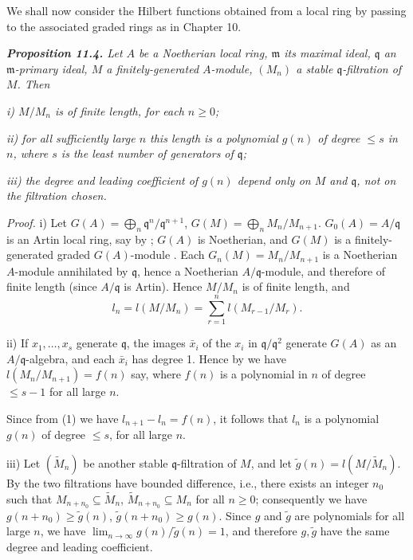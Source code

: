 We shall now consider the Hilbert functions obtained from a local ring by
passing to the associated graded rings as in Chapter 10.

\medskip
\noindent\textit{\textbf{Proposition 11.4.} Let $A$ be a Noetherian local ring, $\mathfrak m$ its maximal ideal,
$\mathfrak q$ an $\mathfrak m$-primary ideal, $M$ a finitely-generated $A$-module, $(M_n)$ a stable $\mathfrak q$-filtration of $M$.  Then}

\noindent\textit{i) $M/M_n$ is of finite length, for each $n\geq0$;}

\noindent\textit{ii) for all sufficiently large $n$ this length is a polynomial $g(n)$ of degree $\leq s$
in $n$, where $s$ is the least number of generators of $\mathfrak q$;}

\noindent\textit{iii) the degree and leading coefficient of $g(n)$ depend only on $M$ and $\mathfrak q$, not on
the filtration chosen.}

\noindent\emph{Proof.}  i) Let $G(A)=\bigoplus_n\mathfrak q^n/\mathfrak q^{n+1}$, $G(M)=\bigoplus_nM_n/M_{n+1}$.  $G_0(A)=A/\mathfrak q$ is an
Artin local ring, say by ; $G(A)$ is Noetherian, and $G(M)$ is a finitely-generated graded $G(A)$-module .  Each $G_n(M)=M_n/M_{n+1}$ is a
Noetherian $A$-module annihilated by $\mathfrak q$, hence a Noetherian $A/\mathfrak q$-module, and
therefore of finite length (since $A/\mathfrak q$ is Artin).  Hence $M/M_n$ is of finite length,
and
\begin{equation}
l_n=l(M/M_n)=\sum_{r=1}^n l(M_{r-1}/M_r).
\tag{1}
\end{equation}

ii) If $x_1,\ldots,x_s$ generate $\mathfrak q$, the images $\bar x_i$ of the $x_i$ in $\mathfrak q/\mathfrak q^2$ generate $G(A)$
as an $A/\mathfrak q$-algebra, and each $\bar x_i$ has degree 1.  Hence by  we have $l(M_n/M_{n+1})
=f(n)$ say, where $f(n)$ is a polynomial in $n$ of degree $\leq s-1$ for all large $n$.

Since from (1) we have $l_{n+1}-l_n=f(n)$, it follows that $l_n$ is a polynomial $g(n)$
of degree $\leq s$, for all large $n$.

iii) Let $(\widetilde M_n)$ be another stable $\mathfrak q$-filtration of $M$, and let $\widetilde g(n)=l(M/\widetilde M_n)$.
By  the two filtrations have bounded difference, i.e., there exists an integer
$n_0$ such that $M_{n+n_0}\subseteq\widetilde M_n$, $\widetilde M_{n+n_0}\subseteq M_n$ for all $n\geq0$; consequently we have
$g(n+n_0)\geq\widetilde g(n)$, $\widetilde g(n+n_0)\geq g(n)$.  Since $g$ and $\widetilde g$ are polynomials for all
large $n$, we have $\lim_{n\to\infty}g(n)/\widetilde g(n)=1$, and therefore $g,\widetilde g$ have the same degree
and leading coefficient.\proofbox

